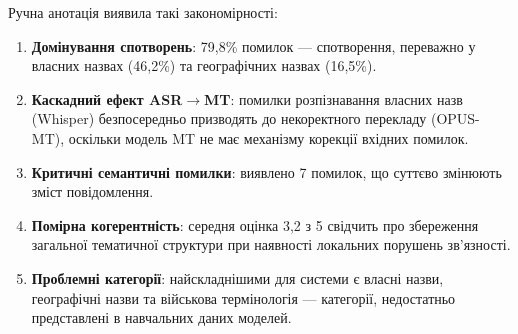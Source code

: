 Ручна анотація виявила такі закономірності:

\begin{enumerate}
    \item \textbf{Домінування спотворень}: 79,8\% помилок --- спотворення,
    переважно у власних назвах (46,2\%) та географічних назвах (16,5\%).

    \item \textbf{Каскадний ефект ASR$\rightarrow$MT}: помилки розпізнавання
    власних назв (Whisper) безпосередньо призводять до некоректного перекладу
    (OPUS-MT), оскільки модель MT не має механізму корекції вхідних помилок.

    \item \textbf{Критичні семантичні помилки}: виявлено 7 помилок, що суттєво
    змінюють зміст повідомлення.

    \item \textbf{Помірна когерентність}: середня оцінка 3,2 з 5 свідчить про
    збереження загальної тематичної структури при наявності локальних порушень
    зв'язності.

    \item \textbf{Проблемні категорії}: найскладнішими для системи є власні
    назви, географічні назви та військова термінологія --- категорії, недостатньо
    представлені в навчальних даних моделей.
\end{enumerate}

